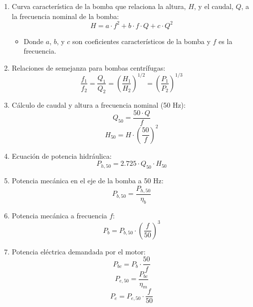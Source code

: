 \begin{enumerate}
\item Curva característica de la bomba que relaciona la altura, \(H\), y el caudal, \(Q\), a la frecuencia nominal de la bomba:
\begin{equation}
H = a \cdot f^2 + b \cdot f \cdot Q + c \cdot Q^2
\end{equation}
\begin{itemize}
\item Donde \(a\), \(b\), y \(c\) son coeficientes característicos de la bomba y \(f\) es la frecuencia.
\end{itemize}
\item Relaciones de semejanza para bombas centrífugas:
\begin{equation}
\frac{f_1}{f_2} = \frac{Q_1}{Q_2} = \left(\frac{H_1}{H_2}\right)^{1/2} = \left(\frac{P_1}{P_2}\right)^{1/3}
\end{equation}
\item Cálculo de caudal y altura a frecuencia nominal (50 Hz):
\begin{equation}
Q_{50} = \frac{50 \cdot Q}{f}
\end{equation}
\begin{equation}
H_{50} = H \cdot \left(\frac{50}{f}\right)^2
\end{equation}
\item Ecuación de potencia hidráulica:
\begin{equation}
P_{h,50} = 2.725 \cdot Q_{50} \cdot H_{50}
\end{equation}
\item Potencia mecánica en el eje de la bomba a 50 Hz:
\begin{equation}
P_{b,50} = \frac{P_{h,50}}{\eta_b}
\end{equation}
\item Potencia mecánica a frecuencia \(f\):
\begin{equation}
P_b = P_{b,50} \cdot \left(\frac{f}{50}\right)^3
\end{equation}
\item Potencia eléctrica demandada por el motor:
\begin{equation}
P_{bc} = P_b \cdot \frac{50}{f}
\end{equation}
\begin{equation}
P_{e,50} = \frac{P_{bc}}{\eta_m}
\end{equation}
\begin{equation}
P_e = P_{e,50} \cdot \frac{f}{50}
\end{equation}

\end{enumerate}
